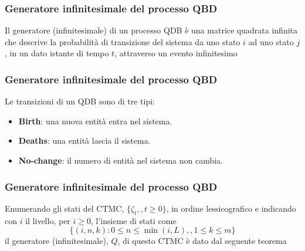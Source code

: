 \documentclass{beamer}
\begin{document}
\begin{frame}
    \frametitle{Generatore infinitesimale del processo QBD}
    \begin{block}{}
        Il generatore (infinitesimale) di un processo QDB è una matrice quadrata infinita che descrive la probabilità di transizione del sistema da uno stato $i$ ad uno stato $j$, in un dato istante di tempo $t$, attraverso un evento infinitesimo
    \end{block}
\end{frame}


\begin{frame}
    \frametitle{Generatore infinitesimale del processo QBD}
    Le transizioni di un QDB sono di tre tipi:
    \begin{itemize}
        \item \textbf{Birth}: una nuova entità entra nel sistema.
        \item \textbf{Deaths}: una entità lascia il sistema.
        \item \textbf{No-change}: il numero di entità nel sistema non cambia.
    \end{itemize}
\end{frame}


\begin{frame}
    \frametitle{Generatore infinitesimale del processo QBD}
    Enumerando gli stati del CTMC, $\{\zeta_t,,t\geq 0\}$, in ordine lessicografico e indicando con $i$ il livello, per $i\geq 0$, l'insieme di stati come
    $$\{(i,n,k):0\leq n\leq \min(i,L),,1\leq k\leq m\}$$
    il generatore (infinitesimale), $Q$, di questo CTMC è dato dal seguente teorema
\end{frame}
\end{document}
